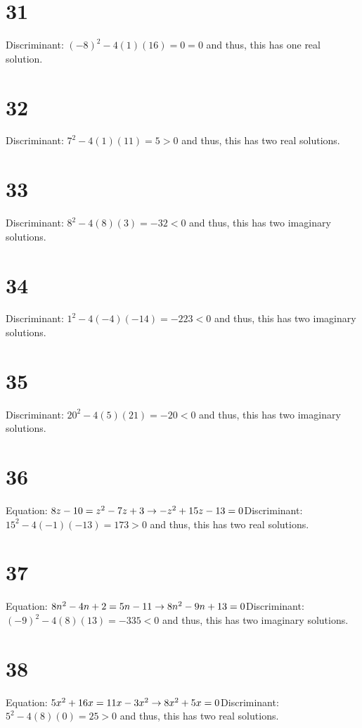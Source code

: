 \documentclass{article}
\theoremstyle{definition}
\begin{document}
\section*{31}
Discriminant: $(-8)^2-4(1)(16)=0=0$ and thus, this has one real solution.

\section*{32}
Discriminant: $7^2-4(1)(11)=5>0$ and thus, this has two real solutions.

\section*{33}
Discriminant: $8^2-4(8)(3)=-32<0$ and thus, this has two imaginary solutions.

\section*{34}
Discriminant: $1^2-4(-4)(-14)=-223<0$ and thus, this has two imaginary solutions. 

\section*{35}
Discriminant: $20^2-4(5)(21)=-20<0$ and thus, this has two imaginary solutions.

\section*{36}
Equation: $8z-10=z^2-7z+3\newline\rightarrow -z^2+15z-13=0$\newline Discriminant: $15^2-4(-1)(-13)=173>0$ and thus, this has two real solutions.

\section*{37}
Equation: $8n^2-4n+2=5n-11\newline\rightarrow 8n^2-9n+13=0$\newline Discriminant: $(-9)^2-4(8)(13)=-335<0$ and thus, this has two imaginary solutions.

\section*{38}
Equation: $5x^2+16x=11x-3x^2\newline\rightarrow 8x^2+5x=0$\newline Discriminant: $5^2-4(8)(0)=25>0$ and thus, this has two real solutions.
\end{document}

